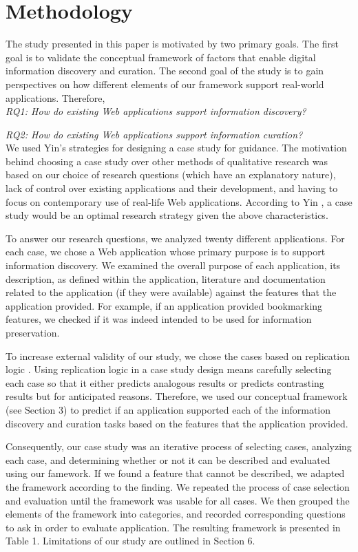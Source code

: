 \documentclass{casconpaper}
\begin{document}
{\section{Methodology}
The study presented in this paper is motivated by two primary goals. The first goal is to validate the conceptual framework of factors that enable digital information discovery and curation. The second goal of the study is to gain perspectives on how different elements of our framework support real-world applications. Therefore, 
\\

\emph{RQ1: How do existing Web applications support information discovery?}

\emph{RQ2: How do existing Web applications support information curation?}\\


We used Yin’s strategies for designing a case study \cite{yin} for guidance. The motivation behind choosing a case study over other methods of qualitative research was based on our choice of research questions (which have an explanatory nature), lack of control over existing applications and their development, and having to focus on contemporary use of real-life Web applications. According to Yin \cite{yin}, a case study would be an optimal research strategy given the above characteristics.

To answer our research questions, we analyzed twenty different applications. For each case, we chose a Web application whose primary purpose is to support information discovery. We examined the overall purpose of each application, its description, as defined within the application, literature and documentation related to the application (if they were available) against the features that the application provided. For example, if an application provided bookmarking features, we checked if it was indeed intended to be used for information preservation. 

To increase external validity of our study, we chose the cases based on replication logic \cite{yin}. Using replication logic in a case study design means carefully selecting each case so that it either predicts analogous results or predicts contrasting results but for anticipated reasons. Therefore, we used our conceptual framework (see Section 3) to predict if an application supported each of the information discovery and curation tasks based on the features that the application provided. 

Consequently, our case study was an iterative process of selecting cases, analyzing each case, and determining whether or not it can be described and evaluated using our famework. If we found a feature that cannot be described, we adapted the framework according to the finding. We repeated the process of case selection and evaluation until the framework was usable for all cases. We then grouped the elements of the framework into categories, and recorded corresponding questions to ask in order to evaluate application. The resulting framework is presented in Table 1. Limitations of our study are outlined in Section 6.
} %
\end{document}
